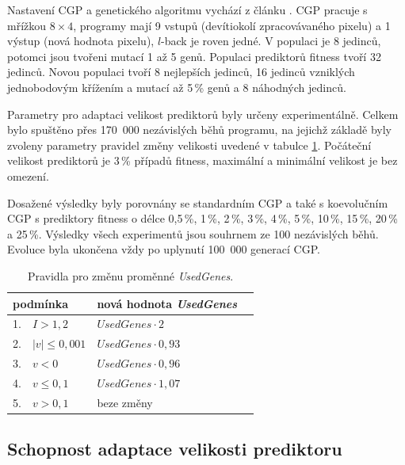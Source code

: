 \documentclass[fleqn,11pt]{ExcelAtFIT} %
\begin{document}
Nastavení CGP a genetického algoritmu vychází z článku \cite{SikuPPSN}. CGP pracuje s mřížkou $8 \times 4$, programy mají 9 vstupů (devítiokolí zpracovávaného pixelu) a 1 výstup (nová hodnota pixelu), $l$-back je roven jedné. V populaci je 8 jedinců, potomci jsou tvořeni mutací 1 až 5 genů. Populaci prediktorů fitness tvoří 32 jedinců. Novou populaci tvoří 8 nejlepších jedinců, 16 jedinců vzniklých jednobodovým křížením a mutací až 5\,\% genů a 8 náhodných jedinců.

Parametry pro adaptaci velikost prediktorů byly určeny experimentálně. Celkem bylo spuštěno přes 170~000 nezávislých běhů programu, na jejichž základě byly zvoleny parametry pravidel změny velikosti uvedené v tabulce \ref{table:rules}. Počáteční velikost prediktorů je 3\,\% případů fitness, maximální a minimální velikost je bez omezení.

Dosažené výsledky byly porovnány se standardním CGP a také s koevolučním CGP s prediktory fitness o délce 0,5\,\%, 1\,\%, 2\,\%, 3\,\%, 4\,\%, 5\,\%, 10\,\%, 15\,\%, 20\,\% a 25\,\%. Výsledky všech experimentů jsou souhrnem ze 100 nezávislých běhů. Evoluce byla ukončena vždy po uplynutí 100~000 generací CGP.

\begin{table}[htb]
    \vskip6pt
    \caption{Pravidla pro změnu proměnné \textit{UsedGenes}.}
    \label{table:rules}
    \centering
    \renewcommand{\arraystretch}{1.2}
    \begin{tabular}{llll}
        \toprule
        \multicolumn{2}{l}{podmínka}      &  nová hodnota \textit{UsedGenes}  \\
        \midrule
        1. &  $I > 1,2$                   &  $\mathit{UsedGenes} \cdot 2    $     \\
        2. &  $\left|v\right| \leq 0,001$ &  $\mathit{UsedGenes} \cdot 0,93 $  \\
        3. &  $v < 0$                     &  $\mathit{UsedGenes} \cdot 0,96 $  \\
        4. &  $v \leq 0,1$                &  $\mathit{UsedGenes} \cdot 1,07 $  \\
        5. &  $v > 0,1$                   &  beze změny             \\
        \bottomrule
    \end{tabular}
\end{table}

\subsection{Schopnost adaptace velikosti prediktoru}
\end{document}
